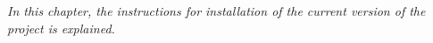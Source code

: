 \emph{In this chapter, the instructions for installation of the current version of the project is explained.}